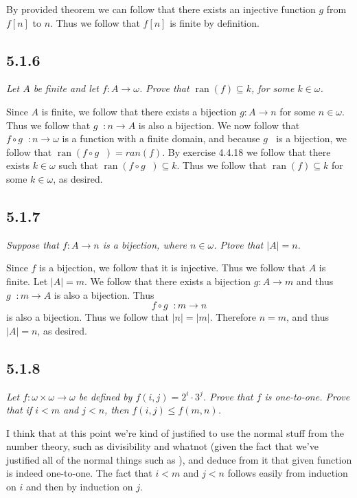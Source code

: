 \documentclass[11pt,oneside,titlepage]{book}
\DeclareMathOperator \inv {^{-1}}
\DeclareMathOperator \ran {ran}
\begin{document}
By provided theorem we can follow that there exists an injective function $g$ from $f[n]$ to $n$.
Thus we follow that $f[n]$ is finite by definition.

\subsection*{5.1.6}

\textit{Let $A$ be finite and let $f: A \to \omega$. Prove that $\ran(f) \subseteq k$, for
  some $k \in \omega$.}


Since $A$ is finite, we follow that there exists a bijection $g: A \to n$
for some $n \in \omega$. Thus we follow that $g \inv: n \to A$ is also a bijection.
We now follow that $f \circ g\inv: n \to \omega $ is a function with a finite domain, and
because $g\inv$ is a bijection, we follow that $\ran(f \circ g\inv) = ran(f)$.
By exercise 4.4.18 we follow that there exists $k \in \omega$ such that
$\ran(f \circ g\inv) \subseteq k$. Thus we follow that $\ran(f) \subseteq k$ for some
$k \in \omega$, as desired.

\subsection*{5.1.7}

\textit{Suppose that $f: A \to n$ is a bijection, where $n \in \omega$. Ptove that $|A| = n$.}

Since $f$ is a bijection, we follow that it is injective. Thus we follow that $A$ is finite.
Let $|A| = m$. We follow that there exists a bijection $g: A \to m$ and thus $g \inv: m \to A$
is also a bijection. Thus
$$f \circ g \inv: m \to n$$
is also a bijection. Thus we follow that $|n| = |m|$. Therefore $n = m$, and thus $|A| = n$,
as desired.

\subsection*{5.1.8}

\textit{Let $f: \omega \times \omega \to \omega$ be defined by $f(i, j) = 2^i \cdot 3^j$.
  Prove that $f$ is one-to-one. Prove that if $i < m$ and $j < n$, then $f(i, j) \leq f(m, n)$.}

I think that at this point we're kind of justified to use the normal stuff from the number
theory, such as divisibility and whatnot (given the fact that we've justified all of the
normal things such as ), and deduce from it that given function is indeed
one-to-one. The fact that $i < m$ and $j < n$ follows easily from induction on $i$ and then
by induction on $j$.
\end{document}
